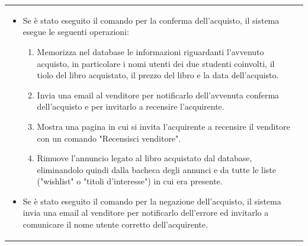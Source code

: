 \documentclass[10pt,a4paper]{report}
\begin{document}
\begin{tabular}{lp{}}
\begin{enumerate}
			\begin{itemize}
				\item Se è stato eseguito il comando per la conferma dell'acquisto, il sistema esegue le seguenti operazioni:
				\begin{enumerate}
					\item Memorizza nel database le informazioni riguardanti l'avvenuto acquisto, in particolare i nomi utenti dei due studenti coinvolti, il tiolo del libro acquistato, il prezzo del libro e la data dell'acquisto.
					\item Invia una email al venditore per notificarlo dell'avvenuta conferma dell'acquisto e per invitarlo a recensire l'acquirente.
					\item Mostra una pagina in cui si invita l'acquirente a recensire il venditore con un comando "Recensisci venditore".
					\item Rimuove l'annuncio legato al libro acquistato dal database, eliminandolo quindi dalla bacheca degli annunci e da tutte le liste ("wishlist" o "titoli d'interesse") in cui era presente.
				\end{enumerate}
				\item Se è stato eseguito il comando per la negazione dell'acquisto, il sistema invia una email al venditore per notificarlo dell'errore ed invitarlo a comunicare il nome utente corretto dell'acquirente.
			\end{itemize}
		\end{enumerate}
	\end{tabular}
\end{document}
